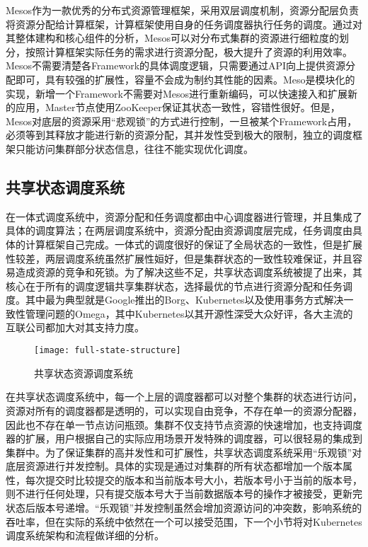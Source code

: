 Mesos作为一款优秀的分布式资源管理框架，采用双层调度机制，资源分配层负责将资源分配给计算框架，计算框架使用自身的任务调度器执行任务的调度。通过对其整体建构和核心组件的分析，Mesos可以对分布式集群的资源进行细粒度的划分，按照计算框架实际任务的需求进行资源分配，极大提升了资源的利用效率。Mesos不需要清楚各Framework的具体调度逻辑，只需要通过API向上提供资源分配即可，具有较强的扩展性，容量不会成为制约其性能的因素。Meso是模块化的实现，新增一个Framework不需要对Mesos进行重新编码，可以快速接入和扩展新的应用，Master节点使用ZooKeeper保证其状态一致性，容错性很好。但是，Mesos对底层的资源采用“悲观锁”的方式进行控制，一旦被某个Framework占用，必须等到其释放才能进行新的资源分配，其并发性受到极大的限制，独立的调度框架只能访问集群部分状态信息，往往不能实现优化调度。
\subsection{共享状态调度系统}
在一体式调度系统中，资源分配和任务调度都由中心调度器进行管理，并且集成了具体的调度算法；在两层调度系统中，资源分配由资源调度层完成，任务调度由具体的计算框架自己完成。一体式的调度很好的保证了全局状态的一致性，但是扩展性较差，两层调度系统虽然扩展性姮好，但是集群状态的一致性较难保证，并且容易造成资源的竞争和死锁。为了解决这些不足，共享状态调度系统被提了出来，其核心在于所有的调度逻辑共享集群状态，选择最优的节点进行资源分配和任务调度。其中最为典型就是Google推出的Borg、Kubernetes以及使用事务方式解决一致性管理问题的Omega，其中Kubernetes以其开源性深受大众好评，各大主流的互联公司都加大对其支持力度。

\begin{figure}[H] %
	\centering
	\texttt{[image: full-state-structure]}
	\caption{共享状态资源调度系统}
	\label{fig:xfig1}
\end{figure}
在共享状态调度系统中，每一个上层的调度器都可以对整个集群的状态进行访问，资源对所有的调度器都是透明的，可以实现自由竞争，不存在单一的资源分配器，因此也不存在单一节点访问瓶颈。集群不仅支持节点资源的快速增加，也支持调度器的扩展，用户根据自己的实际应用场景开发特殊的调度器，可以很轻易的集成到集群中。为了保证集群的高并发性和可扩展性，共享状态调度系统采用“乐观锁”对底层资源进行并发控制。具体的实现是通过对集群的所有状态都增加一个版本属性，每次提交时比较提交的版本和当前版本号大小，若版本号小于当前的版本号，则不进行任何处理，只有提交版本号大于当前数据版本号的操作才被接受，更新完状态后版本号递增。“乐观锁”并发控制虽然会增加资源访问的冲突数，影响系统的吞吐率，但在实际的系统中依然在一个可以接受范围，下一个小节将对Kubernetes调度系统架构和流程做详细的分析。

